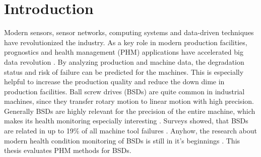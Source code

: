 
\chapter{Introduction}
Modern sensors, sensor networks, computing systems and data-driven techniques have revolutionized the industry. As a key role in modern production facilities, prognostics and health management (PHM) applications have accelerated big data revolution \cite{ZHAO2019213}. By analyzing production and machine data, the degradation status and risk of failure can be predicted for the machines. This is especially helpful to increase the production quality and reduce the down dime in production facilities. Ball screw drives (BSDs) are quite common in industrial machines, since they transfer rotary motion to linear motion with high precision. Generally BSDs are highly relevant for the precision of the entire machine, which makes its health monitoring especially interesting \cite{LiPin2018}. Surveys showed, that BSDs are related in up to 19\% of all machine tool failures \cite{Denkena2021}. Anyhow, the research about modern health condition monitoring of BSDs is still in it's beginnings \cite{LiPin2018}. This thesis evaluates PHM methods for BSDs.


